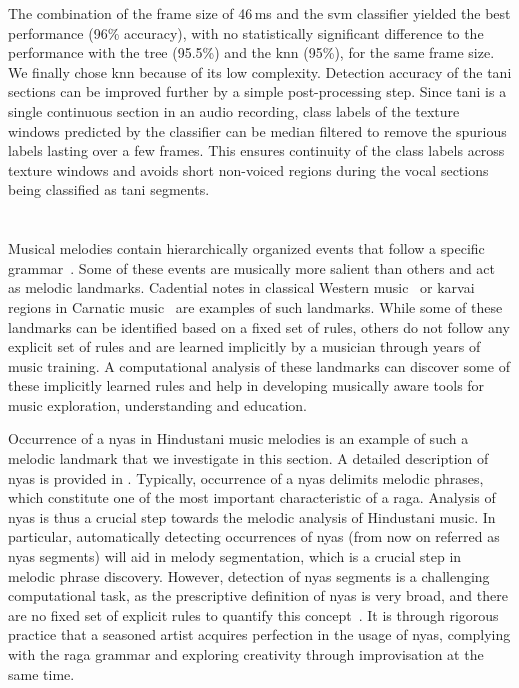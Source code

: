 {The combination of the frame size of 46\,ms and the \gls{svm} classifier yielded the best performance (96\% accuracy), with no statistically significant difference to the performance with the \acrshort{tree} (95.5\%) and the \gls{knn} (95\%), for the same frame size. We finally chose \gls{knn} because of its low complexity. Detection accuracy of the \gls{tani} sections can be improved further by a simple post-processing step. Since \gls{tani} is a single continuous section in an audio recording, class labels of the texture windows predicted by the classifier can be median filtered to remove the spurious labels lasting over a few frames. This ensures continuity of the class labels across texture windows and avoids short non-voiced regions during the vocal sections being classified as \gls{tani} segments. 


\section{}
\label{sec:pre_processing_nyas_segmentation}

Musical melodies contain hierarchically organized events that follow a specific grammar~\citep{Patel07BOOK}. Some of these events are musically more salient than others and act as melodic landmarks. Cadential notes in classical Western music~\citep{GroveCadence} or \gls{karvai} regions in Carnatic music~\citep{sambamoorthy:1998} are examples of such landmarks. While some of these landmarks can be identified based on a fixed set of rules, others do not follow any explicit set of rules and are learned implicitly by a musician through years of music training. A computational analysis of these landmarks can discover some of these implicitly learned rules and help in developing musically aware tools for music exploration, understanding and education. 

Occurrence of a \gls{nyas} in Hindustani music melodies is an example of such a melodic landmark that we investigate in this section. A detailed description of \gls{nyas} is provided in . Typically, occurrence of a \gls{nyas} delimits melodic phrases, which constitute one of the most important characteristic of a \gls{raga}. Analysis of \gls{nyas} is thus a crucial step towards the melodic analysis of Hindustani music. In particular, automatically detecting occurrences of \gls{nyas} (from now on referred as \gls{nyas} segments) will aid in melody segmentation, which is a crucial step in melodic phrase discovery. However, detection of \gls{nyas} segments is a challenging computational task, as the prescriptive definition of \gls{nyas} is very broad, and there are no fixed set of explicit rules to quantify this concept~\citep[p. 73]{Dey2008}. It is through rigorous practice that a seasoned artist acquires perfection in the usage of \gls{nyas}, complying with the \gls{raga} grammar and exploring creativity through improvisation at the same time. 


}
